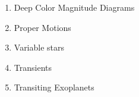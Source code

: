 \begin{enumerate}

\item Deep Color Magnitude Diagrams


\item Proper Motions



\item Variable stars




\item Transients

\item Transiting Exoplanets



\end{enumerate}
